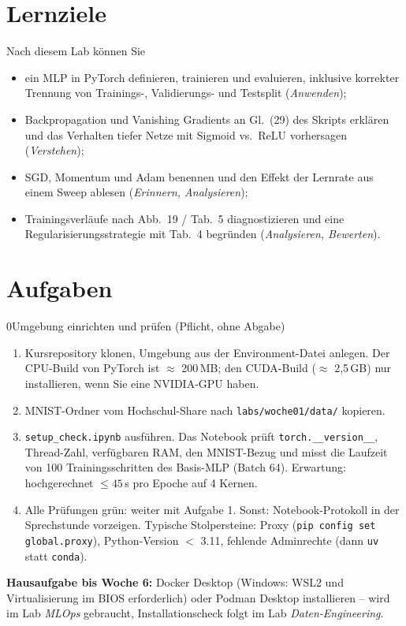 \documentclass[11pt,a4paper]{article}
\newcommand{\code}[1]{\texttt{#1}}
\begin{document}
\section*{Lernziele}
Nach diesem Lab können Sie
\begin{itemize}
  \item ein MLP in PyTorch definieren, trainieren und evaluieren, inklusive korrekter Trennung von Trainings-, Validierungs- und Testsplit (\emph{Anwenden});
  \item Backpropagation und Vanishing Gradients an Gl.\ (29) des Skripts erklären und das Verhalten tiefer Netze mit Sigmoid vs.\ ReLU vorhersagen (\emph{Verstehen});
  \item SGD, Momentum und Adam benennen und den Effekt der Lernrate aus einem Sweep ablesen (\emph{Erinnern, Analysieren});
  \item Trainingsverläufe nach Abb.\ 19 / Tab.\ 5 diagnostizieren und eine Regularisierungsstrategie mit Tab.\ 4 begründen (\emph{Analysieren, Bewerten}).
\end{itemize}

\section*{Aufgaben}

\begin{aufgabe}{0}{Umgebung einrichten und prüfen (Pflicht, ohne Abgabe)}
\begin{enumerate}
  \item Kursrepository klonen, Umgebung aus der Environment-Datei anlegen. Der CPU-Build von PyTorch ist $\approx$ 200\,MB; den CUDA-Build ($\approx$ 2,5\,GB) nur installieren, wenn Sie eine NVIDIA-GPU haben.
  \item MNIST-Ordner vom Hochschul-Share nach \code{labs/woche01/data/} kopieren.
  \item \code{setup\_check.ipynb} ausführen. Das Notebook prüft \code{torch.\_\_version\_\_}, Thread-Zahl, verfügbaren RAM, den MNIST-Bezug und misst die Laufzeit von 100 Trainingsschritten des Basis-MLP (Batch 64). Erwartung: hochgerechnet $\le 45$\,s pro Epoche auf 4 Kernen.
  \item Alle Prüfungen grün: weiter mit Aufgabe 1. Sonst: Notebook-Protokoll in der Sprechstunde vorzeigen. Typische Stolpersteine: Proxy (\code{pip config set global.proxy}), Python-Version $<$ 3.11, fehlende Adminrechte (dann \code{uv} statt \code{conda}).
\end{enumerate}
\textbf{Hausaufgabe bis Woche 6:} Docker Desktop (Windows: WSL2 und Virtualisierung im BIOS erforderlich) oder Podman Desktop installieren -- wird im Lab \emph{MLOps} gebraucht, Installationscheck folgt im Lab \emph{Daten-Engineering}.
\end{aufgabe}
\end{document}
